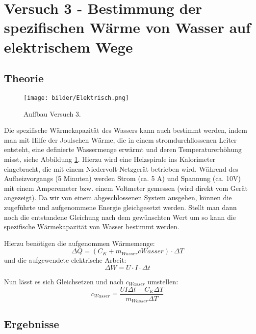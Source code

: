 \section{Versuch 3 - Bestimmung der spezifischen Wärme von Wasser auf elektrischem Wege}
    \subsection{Theorie}
    
        	\begin{figure}[ht]
    	\label{fig:abb3}
    	\begin{center}
    		\texttt{[image: bilder/Elektrisch.png]}
    		\caption{Auffbau Versuch 3.}
    	\end{center}
    \end{figure}
    Die spezifische Wärmekapazität des Wassers kann auch bestimmt werden, indem man mit Hilfe der
    Joulschen Wärme, die in einem stromdurchflossenen Leiter entsteht, eine definierte Wassermenge
    erwärmt und deren Temperaturerhöhung misst, siehe Abbildung \ref{fig:abb3}. Hierzu wird eine Heizspirale ins Kalorimeter
    eingebracht, die mit einem Niedervolt-Netzgerät betrieben wird. Während des Aufheizvorgangs (5
    Minuten) werden Strom (ca. 5 A) und Spannung (ca. 10V) mit einem Amperemeter bzw. einem
    Voltmeter gemessen (wird direkt vom Gerät angezeigt). 
   Da wir von einem abgeschlossenen System ausgehen, können die zugeführte und aufgenommene
   Energie gleichgesetzt werden. Stellt man dann noch die entstandene Gleichung nach dem
   gewünschten Wert um so kann die spezifische Wärmekapazität von Wasser bestimmt werden.
   
   \noindent Hierzu benötigen die aufgenommen Wärmemenge:
   $$\Delta Q = (C_{K} + m_{Wasser}c{Wasser} ) \cdot \Delta T$$
   und die aufgewendete elektrische Arbeit:
   $$\Delta W =  U \cdot I \cdot \Delta t$$
   
   Nun lässt es sich Gleichsetzen und nach $c_{Wasser}$ umstellen:
   $$c_{Wasser} = \frac{UI\Delta t - C_{K}\Delta T}{m_{Wasser} \Delta T}$$
   
    \subsection{Ergebnisse}
	



